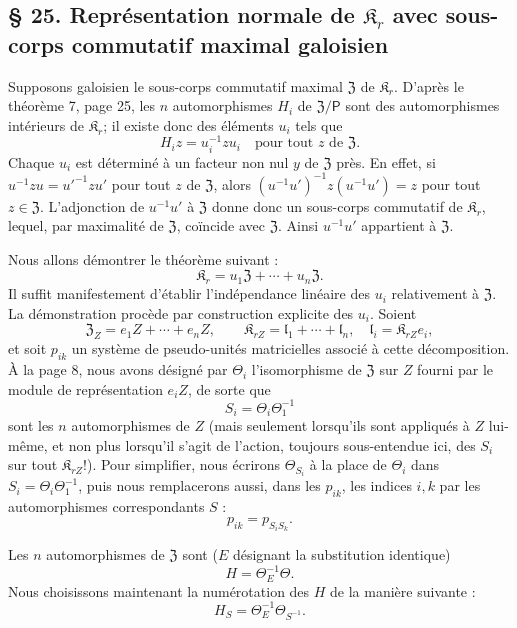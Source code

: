 \subsection*{\S{} 25. Représentation normale de \(\mathfrak K_r\) avec sous-corps commutatif maximal galoisien\protect\footnotemark}\label{fr-r823-representation-normale-sous-corps-galoisien}

Supposons galoisien le sous-corps commutatif maximal \(\mathfrak Z\) de \(\mathfrak K_r\). D'après le théorème 7, page 25, les \(n\) automorphismes \(H_i\) de \(\mathfrak Z/\mathsf P\) sont des automorphismes intérieurs de \(\mathfrak K_r\); il existe donc des éléments \(u_i\) tels que
\[
H_i z=u_i^{-1}zu_i\quad\text{pour tout }z\text{ de }\mathfrak Z.
\]
Chaque \(u_i\) est déterminé à un facteur non nul \(y\) de \(\mathfrak Z\) près. En effet, si \(u^{-1}zu=u'^{-1}zu'\) pour tout \(z\) de \(\mathfrak Z\), alors \((u^{-1}u')^{-1}z(u^{-1}u')=z\) pour tout \(z\in\mathfrak Z\). L'adjonction de \(u^{-1}u'\) à \(\mathfrak Z\) donne donc un sous-corps commutatif de \(\mathfrak K_r\), lequel, par maximalité de \(\mathfrak Z\), coïncide avec \(\mathfrak Z\). Ainsi \(u^{-1}u'\) appartient à \(\mathfrak Z\).

Nous allons démontrer le théorème suivant :
\[
\mathfrak K_r=u_1\mathfrak Z+\cdots+u_n\mathfrak Z.
\]
Il suffit manifestement d'établir l'indépendance linéaire des \(u_i\) relativement à \(\mathfrak Z\). La démonstration procède par construction explicite des \(u_i\). Soient
\[
\mathfrak Z_Z=e_1Z+\cdots+e_nZ,\qquad
\mathfrak K_{rZ}=\mathfrak l_1+\cdots+\mathfrak l_n,\quad
\mathfrak l_i=\mathfrak K_{rZ}e_i,
\]
et soit \(p_{ik}\) un système de pseudo-unités matricielles associé à cette décomposition. À la page 8, nous avons désigné par \(\Theta_i\) l'isomorphisme de \(\mathfrak Z\) sur \(Z\) fourni par le module de représentation \(e_iZ\), de sorte que
\[
S_i=\Theta_i\Theta_1^{-1}
\]
sont les \(n\) automorphismes de \(Z\) (mais seulement lorsqu'ils sont appliqués à \(Z\) lui-même, et non plus lorsqu'il s'agit de l'action, toujours sous-entendue ici, des \(S_i\) sur tout \(\mathfrak K_{rZ}\)!). Pour simplifier, nous écrirons \(\Theta_{S_i}\) à la place de \(\Theta_i\) dans \(S_i=\Theta_i\Theta_1^{-1}\), puis nous remplacerons aussi, dans les \(p_{ik}\), les indices \(i,k\) par les automorphismes correspondants \(S\) :
\[
p_{ik}=p_{S_iS_k}.
\]

Les \(n\) automorphismes de \(\mathfrak Z\) sont (\(E\) désignant la substitution identique)
\[
H=\Theta_E^{-1}\Theta.
\]
Nous choisissons maintenant la numérotation des \(H\) de la manière suivante :
\[
H_S=\Theta_E^{-1}\Theta_{S^{-1}}.
\]

